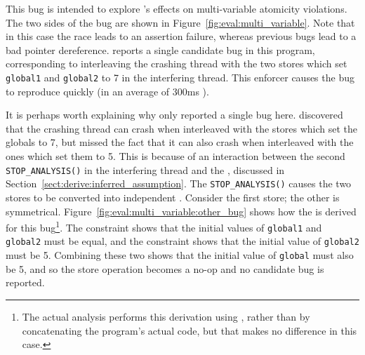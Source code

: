This bug is intended to explore {\technique}'s effects on
multi-variable atomicity violations.  The two sides of the bug are
shown in Figure~\ref{fig:eval:multi_variable}.  Note that in this case
the race leads to an assertion failure, whereas previous bugs lead to
a bad pointer dereference.  {\Technique} reports a single candidate
bug in this program, corresponding to interleaving the crashing thread
with the two stores which set \texttt{global1} and \texttt{global2} to
7 in the interfering thread.  This enforcer causes the bug to
reproduce quickly (in an average of 300ms ).

It is perhaps worth explaining why {\technique} only reported a single
bug here.  {\Technique} discovered that the crashing thread can crash
when interleaved with the stores which set the globals to 7, but
missed the fact that it can also crash when interleaved with the ones
which set them to 5.  This is because of an interaction between the
second \texttt{STOP\_ANALYSIS()} in the interfering thread and the
, discussed in
Section~\ref{sect:derive:inferred_assumption}.  The
\texttt{STOP\_ANALYSIS()} causes the two stores to be converted into
independent {\StateMachines}.  Consider the first store; the other is
symmetrical.  Figure~\ref{fig:eval:multi_variable:other_bug} shows how
the  is derived for this bug\footnote{The
  actual analysis performs this derivation using {\StateMachines},
  rather than by concatenating the program's actual code, but that
  makes no difference in this case.}.  The 
constraint shows that the initial values of \texttt{global1} and
\texttt{global2} must be equal, and the  constraint
shows that the initial value of \texttt{global2} must be 5.  Combining
these two shows that the initial value of \texttt{global} must also be
5, and so the store operation becomes a no-op and no candidate bug is
reported.

